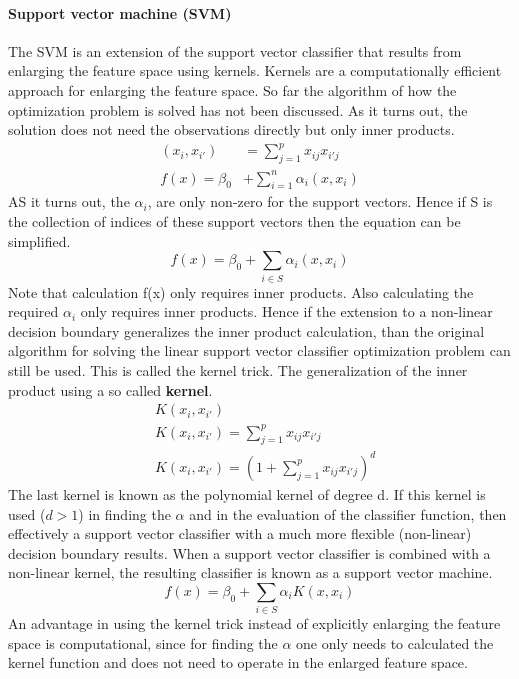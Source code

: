 \documentclass[../document.tex]{subfiles}
\begin{document}
	\paragraph{Support vector machine (SVM)}
	The SVM is an extension of the support vector classifier that results from enlarging the feature space using kernels. Kernels are a computationally efficient approach for enlarging the feature space. So far the algorithm of how the optimization problem is solved has not been discussed. As it turns out, the solution does not need the observations directly but only inner products.
	\begin{equation}
	\begin{split}
		(x_{i},x_{i'})&=\sum_{j=1}^{p}x_{ij}x_{i'j}\\
		f(x)=\beta_{0}&+\sum_{i=1}^{n}\alpha_{i}(x,x_{i})
	\end{split}
	\end{equation}
	AS it turns out, the \(\alpha_{i}\), are only non-zero for the support vectors. Hence if S is the collection of indices of these support vectors then the equation can be simplified.
	\begin{equation}
		f(x)=\beta_{0}+\sum_{i\in S}\alpha_{i}(x,x_{i})
	\end{equation}
	Note that calculation f(x) only requires inner products. Also calculating the required \(\alpha_{i}\) only requires inner products. Hence if the extension to a non-linear decision boundary generalizes the inner product calculation, than the original algorithm for solving the linear support vector classifier optimization problem can still be used. This is called the kernel trick. The generalization of the inner product using a so called \textbf{kernel}.
	\begin{equation}
	\begin{split}
		&K(x_{i},x_{i'})\\
		&K(x_{i},x_{i'})=\sum_{j=1}^{p}x_{ij}x_{i'j}\\
		&K(x_{i},x_{i'})=(1+\sum_{j=1}^{p}x_{ij}x_{i'j})^d
	\end{split}
	\end{equation}
	The last kernel is known as the polynomial kernel of degree d. If this kernel is used (\(d>1\)) in finding the \(\alpha\) and in the evaluation of the classifier function, then effectively a support vector classifier with a much more flexible (non-linear) decision boundary results. When a support vector classifier is combined with a non-linear kernel, the resulting classifier is known as a support vector machine.
	\begin{equation}
		f(x)=\beta_{0}+\sum_{i\in S}\alpha_{i}K(x,x_{i})
	\end{equation}
	An advantage in using the kernel trick instead of explicitly enlarging the feature space is computational, since for finding the \(\alpha\) one only needs to calculated the kernel function and does not need to operate in the enlarged feature space.
\end{document}
